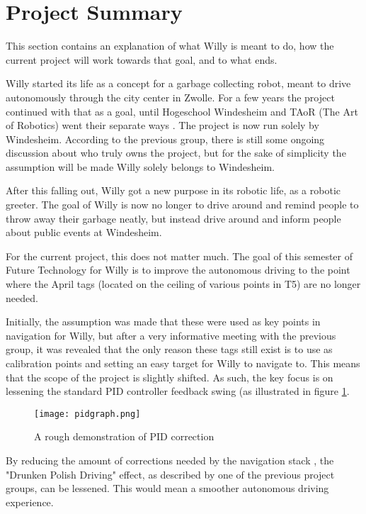 \section{Project Summary}
This section contains an explanation of what Willy is meant to do, how the current project will work towards that goal, and to what ends.

Willy started its life as a concept for a garbage collecting robot, meant to drive autonomously through the city center in Zwolle.
For a few years the project continued with that as a goal, until Hogeschool Windesheim and TAoR (The Art of Robotics) went their separate ways \cite{taor}.
The project is now run solely by Windesheim.
According to the previous group, there is still some ongoing discussion about who truly owns the project, but for the sake of simplicity the assumption will be made Willy solely belongs to Windesheim.

After this falling out, Willy got a new purpose in its robotic life, as a robotic greeter.
The goal of Willy is now no longer to drive around and remind people to throw away their garbage neatly, but instead drive around and inform people about public events at Windesheim.

For the current project, this does not matter much.
The goal of this semester of Future Technology for Willy is to improve the autonomous driving to the point where the April tags (located on the ceiling of various points in T5) are no longer needed.

Initially, the assumption was made that these were used as key points in navigation for Willy, but after a very informative meeting with the previous group, it was revealed that the only reason these tags still exist is to use as calibration points and setting an easy target for Willy to navigate to.
This means that the scope of the project is slightly shifted.
As such, the key focus is on lessening the standard PID controller feedback swing (as illustrated in figure \ref{fig::pid}.

\begin{figure}[H]
\texttt{[image: pidgraph.png]}
\caption{A rough demonstration of PID correction}
\label{fig::pid}
\end{figure}

By reducing the amount of corrections needed by the navigation stack \cite{navstack}, the "Drunken Polish Driving" effect, as described by one of the previous project groups, can be lessened.
This would mean a smoother autonomous driving experience.
\newpage